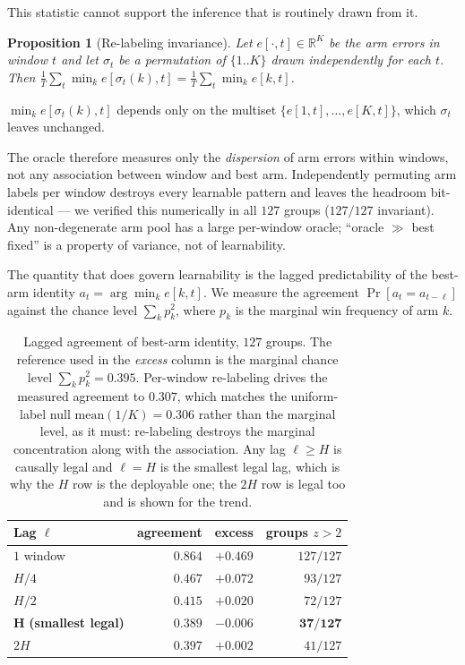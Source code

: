 \documentclass[a4paper,fleqn]{cas-sc}
\newtheorem{proposition}{Proposition}
\begin{document}
This statistic cannot support the inference that is routinely drawn from it.

\begin{proposition}[Re-labeling invariance]
\label{prop:invariance}
Let $e[\cdot,t]\in\mathbb{R}^{K}$ be the arm errors in window $t$ and let
$\sigma_t$ be a permutation of $\{1..K\}$ drawn independently for each $t$.
Then $\frac{1}{T}\sum_t \min_k e[\sigma_t(k),t] = \frac{1}{T}\sum_t \min_k e[k,t]$.
\end{proposition}

\begin{pf}
$\min_k e[\sigma_t(k),t]$ depends only on the multiset
$\{e[1,t],\dots,e[K,t]\}$, which $\sigma_t$ leaves unchanged.
\end{pf}

The oracle therefore measures only the \emph{dispersion} of arm errors within
windows, not any association between window and best arm. Independently
permuting arm labels per window destroys every learnable pattern and leaves the
headroom bit-identical --- we verified this numerically in all $127$ groups
($127/127$ invariant). Any non-degenerate arm pool has a large per-window
oracle; ``oracle $\gg$ best fixed'' is a property of variance, not of
learnability.

The quantity that does govern learnability is the lagged predictability of the
best-arm identity $a_t = \arg\min_k e[k,t]$. We measure the agreement
$\Pr[a_t = a_{t-\ell}]$ against the chance level
$\sum_k p_k^2$, where $p_k$ is the marginal win frequency of arm $k$.

\begin{table}[t]
\centering\small
\caption{Lagged agreement of best-arm identity, $127$ groups. The reference used
in the \emph{excess} column is the marginal chance level
$\sum_k p_k^2 = 0.395$. Per-window re-labeling drives the measured agreement to
$0.307$, which matches the uniform-label null $\mathrm{mean}(1/K) = 0.306$ rather
than the marginal level, as it must: re-labeling destroys the marginal
concentration along with the association. Any lag $\ell \ge H$ is causally legal
and $\ell = H$ is the smallest legal lag, which is why the $H$ row is the
deployable one; the $2H$ row is legal too and is shown for the trend.}
\label{tab:persist}
\begin{tabular}{lrrr}
\toprule
Lag $\ell$ & agreement & excess & groups $z>2$ \\
\midrule
$1$ window & $0.864$ & $+0.469$ & $127/127$ \\
$H/4$      & $0.467$ & $+0.072$ & $93/127$ \\
$H/2$      & $0.415$ & $+0.020$ & $72/127$ \\
$\mathbf{H}$ \textbf{(smallest legal)} & $\mathbf{0.389}$ & $\mathbf{-0.006}$ & $\mathbf{37/127}$ \\
$2H$       & $0.397$ & $+0.002$ & $41/127$ \\
\bottomrule
\end{tabular}
\end{table}
\end{document}
